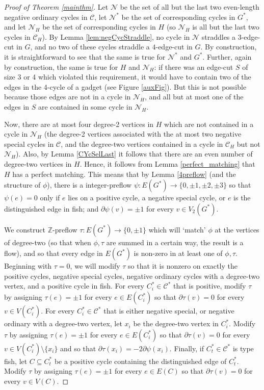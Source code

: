 \documentclass[12pt]{article}
\newcommand{\Z}{\mathbb{Z}}
\begin{document}
\begin{proof}[Proof of Theorem \ref{mainthm}]
Let $\mathcal{N}$ be the set of all but the last two even-length negative ordinary cycles in $\mathcal{C}$, let $\mathcal{N}^*$ be the set of corresponding cycles in $G^*$, and let $\mathcal{N}_H$ be the set of corresponding cycles in $H$ (so $\mathcal{N}_H$ is all but the last two cycles in $\mathcal{C}_H$). By Lemma \ref{lem:negCycStraddle}, no cycle in $\mathcal{N}$ straddles a 3-edge-cut in $G$, and no two of these cycles straddle a $4$-edge-cut in $G$. By construction, it is straightforward to see that the same is true for $\mathcal{N^*}$ and $G^*$. Further, again by construction, the same is true for $H$ and $\mathcal{N}_H$: if there was an edge-cut $S$ of size 3 or 4 which violated this requirement, it would have to contain two of the edges in the 4-cycle of a gadget (see Figure \ref{auxFig}). But this is not possible because those edges are not in a cycle in $\mathcal{N}_H$, and all but at most one of the edges in $S$ are contained in some cycle in $\mathcal{N}_H$. 

Now, there are at most four degree-2 vertices in $H$ which are not contained in a cycle in $\mathcal{N}_H$ (the degree-2 vertices associated with the at most two negative special cycles in $\mathcal{C}$, and the degree-two vertices contained in a cycle in $\mathcal{C}_H$ but not $\mathcal{N}_H$). Also, by Lemma \ref{CYcSelLast} it follows that there are an even number of degree-two vertices in $H$. Hence, it follows from Lemma \ref{perfect_matching} that $H$ has a perfect matching. This means that by Lemma \ref{4preflow} (and the structure of $\phi$), there is a integer-preflow $\psi: E(G^*) \to \{0, \pm1, \pm2,\pm3\}$ so that $\psi(e) = 0$ only if $e$ lies on a positive cycle, a negative special cycle, or $e$ is the distinguished edge in fish; and $\partial \psi(v) = \pm 1$ for every $v \in V_2(G^*)$.

We construct $\Z$-preflow $\tau: E(G^*) \to \{0, \pm 1\} $ which will `match' $\phi$ at the vertices of degree-two (so that when $\phi, \tau$ are summed in a certain way, the result is a flow), and so that every edge in $E(G^*)$ is non-zero in at least one of $\phi, \tau$. 
Beginning with $\tau = 0$, we will modify $\tau$ so that it is nonzero on exactly the positive cycles, negative special cycles, negative ordinary cycles with a degree-two vertex, and a positive cycle in fish. For every $C_i^* \in \mathcal{C}^*$ that is positive, modify $\tau$ by assigning $\tau(e) = \pm 1$ for every $e \in E(C_i^*)$ so that $\partial \tau (v) = 0$ for every $v \in V(C_i^*)$. For every $C_i^* \in \mathcal{C}^*$ that is either negative special, or negative ordinary with a degree-two vertex, let $x_i$ be the degree-two vertex in $C_i^*$.  Modify $\tau$ by assigning $\tau(e) = \pm 1$ for every $e \in E(C_i^*)$ so that $\partial \tau(v) = 0$ for every $v \in V(C_i^*) \setminus \{x_i\}$ and so that $\partial \tau( x_i) = -2 \partial \psi(x_i)$.
Finally, if $C_t^* \in \mathcal{C}^*$ is type fish, let $C \subseteq C_t^*$ be a positive cycle containing the distinguished edge of $C_t^*$. Modify $\tau$ by assigning $\tau(e) = \pm 1$ for every $e \in E(C)$ so that $\partial \tau (v) = 0$ for every $v \in V(C)$. 


\end{proof}
\end{document}
